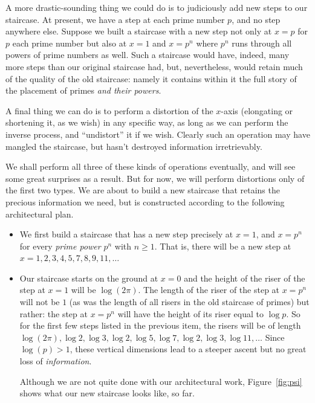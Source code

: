 \documentclass[openany]{book}
\theoremstyle{plain}
\theoremstyle{definition}
\begin{document}
{A more drastic-sounding thing we could do is to judiciously add new
steps to our staircase. At present, we have a step at each prime
number $p$, and no step anywhere else. Suppose we built a staircase
with a new step not only at $x=p$ for $p$ each prime number but also at
$x =1$ and $x=p^n$ where $p^n$ runs through all powers of prime numbers as
well. Such a staircase would have, indeed, many more steps than our
original staircase had, but, nevertheless, would retain much of the
quality of the old staircase: namely it contains within it the full
story of the placement of primes {\em and their powers}.

A final thing we can do is to perform a distortion of the $x$-axis
(elongating or shortening it, as we wish) in any specific way, as long
as we can perform the inverse process, and ``undistort'' it if we wish.
Clearly such an operation may have mangled the staircase, but hasn't destroyed
information irretrievably.

We shall perform all three of these kinds of operations eventually,
and will see some great surprises as a result.  But for now, we will
perform distortions only of the first two types.  We are about to
build a new staircase that retains the precious information we need,
but is constructed according to the following architectural plan.

 \begin{itemize}

 \item We first build a staircase that has a new step precisely at $x
   =1$, and $ x= p^n$ for every {\em prime power} $p^n$ with $n\geq
   1$. That is, there will be a new step at $x= 1,2,3,4,5,7,8,9,11,
   \dots$

 \item Our staircase starts on the ground at $x=0$ and the height of the
   riser of the step at $x=1$ will be $\log(2\pi)$. The length of the
   riser of the step at $x=p^n$ will not be $1$
   (as was the length of all risers in the old staircase of primes)
   but rather: the step at $x=p^n$ will have the height of its riser
   equal to $\log p$.  So for the first few steps listed in the
   previous item, the risers will be of length $\log(2\pi), \log
   2,\log 3,\log 2,\log 5,\log 7, \log 2,\log 3,\log 11, \dots$
   Since $\log(p)>1$,
  these vertical dimensions lead to a steeper ascent but no great loss
  of {\em information}.

   Although we are not quite done with our architectural work, Figure~\ref{fig:psi} shows
   what our new staircase looks like, so far.


\end{itemize}}
\end{document}
